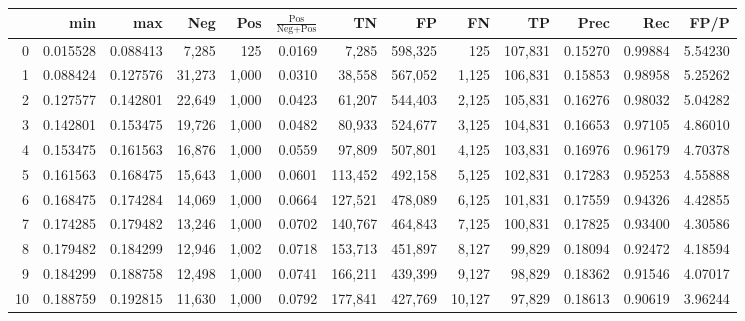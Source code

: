 \begin{tabular}{rrrrrrrrrrrrr}
\toprule
{} &       min &       max &     Neg &    Pos & $\frac{\text{Pos}}{\text{Neg}+\text{Pos}}$ &       TN &       FP &       FN &       TP &     Prec &      Rec &     FP/P \\
\midrule
0   &  0.015528 &  0.088413 &   7,285 &    125 &                                     0.0169 &    7,285 &  598,325 &      125 &  107,831 &  0.15270 &  0.99884 &  5.54230 \\
1   &  0.088424 &  0.127576 &  31,273 &  1,000 &                                     0.0310 &   38,558 &  567,052 &    1,125 &  106,831 &  0.15853 &  0.98958 &  5.25262 \\
2   &  0.127577 &  0.142801 &  22,649 &  1,000 &                                     0.0423 &   61,207 &  544,403 &    2,125 &  105,831 &  0.16276 &  0.98032 &  5.04282 \\
3   &  0.142801 &  0.153475 &  19,726 &  1,000 &                                     0.0482 &   80,933 &  524,677 &    3,125 &  104,831 &  0.16653 &  0.97105 &  4.86010 \\
4   &  0.153475 &  0.161563 &  16,876 &  1,000 &                                     0.0559 &   97,809 &  507,801 &    4,125 &  103,831 &  0.16976 &  0.96179 &  4.70378 \\
5   &  0.161563 &  0.168475 &  15,643 &  1,000 &                                     0.0601 &  113,452 &  492,158 &    5,125 &  102,831 &  0.17283 &  0.95253 &  4.55888 \\
6   &  0.168475 &  0.174284 &  14,069 &  1,000 &                                     0.0664 &  127,521 &  478,089 &    6,125 &  101,831 &  0.17559 &  0.94326 &  4.42855 \\
7   &  0.174285 &  0.179482 &  13,246 &  1,000 &                                     0.0702 &  140,767 &  464,843 &    7,125 &  100,831 &  0.17825 &  0.93400 &  4.30586 \\
8   &  0.179482 &  0.184299 &  12,946 &  1,002 &                                     0.0718 &  153,713 &  451,897 &    8,127 &   99,829 &  0.18094 &  0.92472 &  4.18594 \\
9   &  0.184299 &  0.188758 &  12,498 &  1,000 &                                     0.0741 &  166,211 &  439,399 &    9,127 &   98,829 &  0.18362 &  0.91546 &  4.07017 \\
10  &  0.188759 &  0.192815 &  11,630 &  1,000 &                                     0.0792 &  177,841 &  427,769 &   10,127 &   97,829 &  0.18613 &  0.90619 &  3.96244 \\

\end{tabular}
